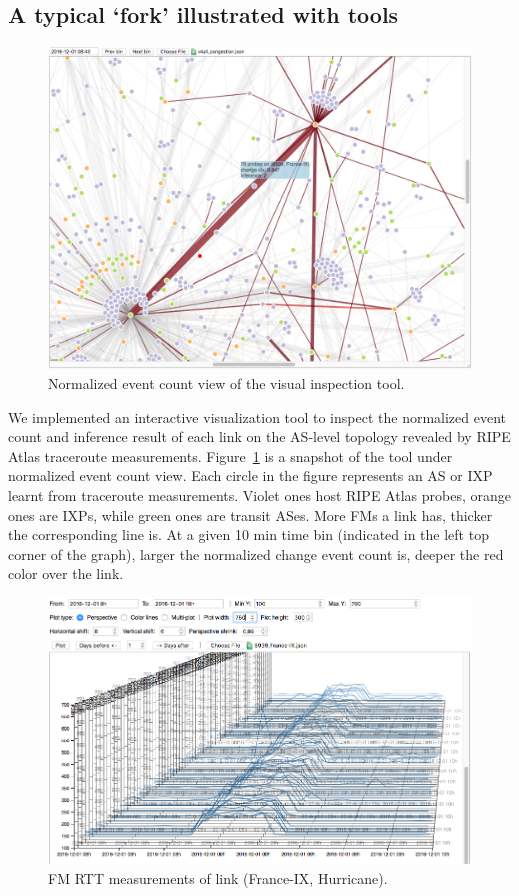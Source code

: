 \subsection{A typical `fork' illustrated with tools}
\begin{figure}[!htb]
\centering
\includegraphics[width=1\textwidth]{gfx/chap5/case_event_count.png}
\caption{Normalized event count view of the visual inspection tool.}
\label{fig:case_event_count}
\end{figure}

We implemented an interactive visualization tool to inspect the normalized event count and inference result of each link on the AS-level topology revealed by RIPE Atlas traceroute measurements.
Figure~\ref{fig:case_event_count} is a snapshot of the tool under normalized event count view.
Each circle in the figure represents an AS or IXP learnt from traceroute measurements. Violet ones host RIPE Atlas probes, orange ones are IXPs, while green ones are transit ASes. More \acp{FM} a link has, thicker the corresponding line is. At a given 10 min time bin (indicated in the left top corner of the graph), larger the normalized change event count is, deeper the red color over the link.

\begin{figure}[!htb]
\centering
\includegraphics[width=1\textwidth]{gfx/chap5/case_multi_rtt.png}
\caption{\ac{FM} RTT measurements of link (France-IX, Hurricane).}
\label{fig:case_multi_rtt}
\end{figure}

